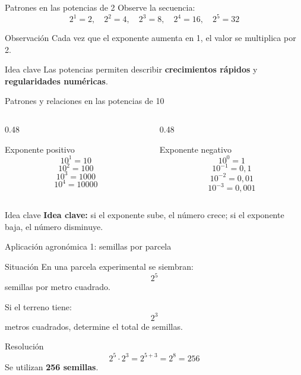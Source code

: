 \documentclass[aspectratio=169,10pt,handout]{beamer}
\newcommand{\destacar}[1]{\textcolor{USTBlueDark}{\textbf{#1}}}
\newcommand{\pp}{\pause}
\newenvironment{ideaBox}
{\begin{exampleblock}{Idea clave}}
	{\end{exampleblock}}
\begin{document}
	\begin{frame}{Patrones en las potencias de 2}
		Observe la secuencia:
		\[
		2^1=2,\quad 2^2=4,\quad 2^3=8,\quad 2^4=16,\quad 2^5=32
		\]
		
		\begin{block}{Observación}
			Cada vez que el exponente aumenta en 1, el valor se multiplica por 2.
		\end{block}
		
		\pp
		
		\begin{ideaBox}
			Las potencias permiten describir \destacar{crecimientos rápidos} y \destacar{regularidades numéricas}.
		\end{ideaBox}
	\end{frame}
	
	\begin{frame}{Patrones y relaciones en las potencias de 10}
		\begin{columns}[T,totalwidth=\textwidth]
			\begin{column}{0.48\textwidth}
				\begin{block}{Exponente positivo}
					\[
					10^1 = 10
					\]
					\[
					10^2 = 100
					\]
					\[
					10^3 = 1000
					\]
					\[
					10^4 = 10000
					\]
				\end{block}
			\end{column}
			
			\begin{column}{0.48\textwidth}
				\begin{exampleblock}{Exponente negativo}
					\[
					10^0 = 1
					\]
					\[
					10^{-1} = 0{,}1
					\]
					\[
					10^{-2} = 0{,}01
					\]
					\[
					10^{-3} = 0{,}001
					\]
				\end{exampleblock}
			\end{column}
		\end{columns}
		
		\vspace{0.2cm}
		\begin{ideaBox}
			\textbf{Idea clave:} si el exponente sube, el número crece; si el exponente baja, el número disminuye.
		\end{ideaBox}
	\end{frame}
	
	\begin{frame}{Aplicación agronómica 1: semillas por parcela}
		\begin{block}{Situación}
			En una parcela experimental se siembran:
			\[
			2^5
			\]
			semillas por metro cuadrado.
			
			Si el terreno tiene:
			\[
			2^3
			\]
			metros cuadrados, determine el total de semillas.
		\end{block}
		
		\pp
		
		\begin{exampleblock}{Resolución}
			\[
			2^5\cdot2^3 = 2^{5+3}=2^8=256
			\]
			Se utilizan \textbf{256 semillas}.
		\end{exampleblock}
	\end{frame}
	
\end{document}
